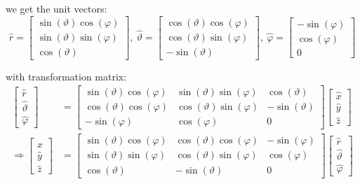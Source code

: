 \documentclass[11pt,a4paper]{article}
\begin{document}
\begin{enumerate}
we get the unit vectors:
\begin{equation}
\hat{r}=
\begin{bmatrix}
\sin(\vartheta)\cos(\varphi) \\
\sin(\vartheta)\sin(\varphi) \\
\cos(\vartheta)
\end{bmatrix},\ 
\hat{\vartheta}=
\begin{bmatrix}
\cos(\vartheta)\cos(\varphi) \\
\cos(\vartheta)\sin(\varphi) \\
-\sin(\vartheta)
\end{bmatrix},\ 
\hat{\varphi}=
\begin{bmatrix}
-\sin(\varphi) \\
\cos(\varphi) \\
0
\end{bmatrix}
\end{equation}

with transformation matrix:
\begin{align}
\begin{bmatrix}
\hat{r} \\
\hat{\vartheta} \\
\hat{\varphi}
\end{bmatrix}
&=
\begin{bmatrix}
\sin(\vartheta)\cos(\varphi) & \sin(\vartheta)\sin(\varphi) & \cos(\vartheta) \\
\cos(\vartheta)\cos(\varphi) & \cos(\vartheta)\sin(\varphi) & -\sin(\vartheta) \\
-\sin(\varphi) & \cos(\varphi) & 0
\end{bmatrix}
\begin{bmatrix}
\hat{x} \\
\hat{y} \\
\hat{z}
\end{bmatrix} \\
\Rightarrow
\begin{bmatrix}
\hat{x} \\
\hat{y} \\
\hat{z}
\end{bmatrix}
&=
\begin{bmatrix}
\sin(\vartheta)\cos(\varphi) & \cos(\vartheta)\cos(\varphi) & -\sin(\varphi) \\
\sin(\vartheta)\sin(\varphi) & \cos(\vartheta)\sin(\varphi) & \cos(\varphi) \\
\cos(\vartheta) & -\sin(\vartheta) & 0
\end{bmatrix}
\begin{bmatrix}
\hat{r} \\
\hat{\vartheta} \\
\hat{\varphi}
\end{bmatrix}
\end{align}


\end{enumerate}
\end{document}
